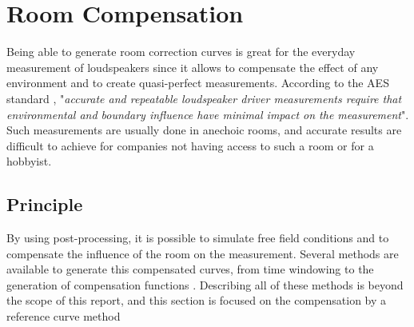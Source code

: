 \documentclass{report}
\begin{document}
\chapter{Room Compensation}

Being able to generate room correction curves is great for the everyday measurement of loudspeakers since it allows to compensate the effect of any environment and to create quasi-perfect measurements. According to the AES standard \cite{aesstandart}, "\textit{accurate and repeatable loudspeaker driver measurements require that environmental and boundary influence have minimal impact on the measurement}". Such measurements are usually done in anechoic rooms, and accurate results are difficult to achieve for companies not having access to such a room or for a hobbyist.

\section{Principle}

By using post-processing, it is possible to simulate free field conditions and to compensate the influence of the room on the measurement. Several methods are available to generate this compensated curves, from time windowing to the generation of compensation functions \citep[see][]{aeswb}. Describing all of these methods is beyond the scope of this report, and this section is focused on the compensation by a reference curve method \\
\end{document}
